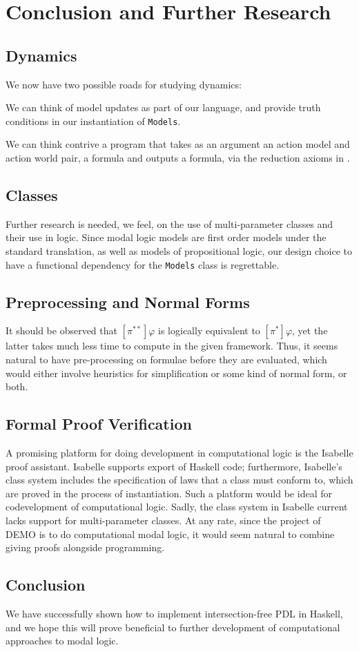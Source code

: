 \documentclass[11pt]{article}
\theoremstyle{definition}
\begin{document}
\section{Conclusion and Further Research}

\subsection{Dynamics}
We now have two possible roads for studying dynamics:
\begin{mynum}
\item We can think of model updates as part of our language, and provide truth conditions in our instantiation of \texttt{Models}.
\item We can think contrive a program that takes as an argument an action model and action world pair, a formula and outputs a formula, via the reduction axioms in \cite{1225972}.
\end{mynum}

\subsection{Classes}
Further research is needed, we feel, on the use of multi-parameter classes and their use in logic.  Since modal logic models are first order models under the standard translation, as well as models of propositional logic, our design choice to have a functional dependency for the \texttt{Models} class is regrettable.

\subsection{Preprocessing and Normal Forms}
It should be observed that $[\pi^{\ast\ast}] \varphi$ is logically equivalent to $[\pi^\ast] \varphi$, yet the latter takes much less time to compute in the given framework.  Thus, it seems natural to have pre-processing on formulae before they are evaluated, which would either involve heuristics for simplification or some kind of normal form, or both.

\subsection{Formal Proof Verification}
A promising platform for doing development in computational logic is the Isabelle proof assistant.  Isabelle supports export of Haskell code; furthermore, Isabelle's class system includes the specification of laws that a class must conform to, which are proved in the process of instantiation.  Such a platform would be ideal for codevelopment of computational logic.  Sadly, the class system in Isabelle current lacks support for multi-parameter classes.  At any rate, since the project of \textsf{DEMO} is to do computational modal logic, it would seem natural to combine giving proofs alongside programming.

\subsection{Conclusion}
We have successfully shown how to implement intersection-free PDL in Haskell, and we hope this will prove beneficial to further development of computational approaches to modal logic.

\pagebreak


\end{document}
